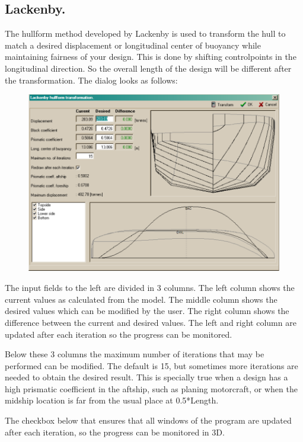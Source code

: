 \documentclass[12pt]{article}
\begin{document}
\subsection{Lackenby.}
The hullform method developed by Lackenby is used to transform the
hull to match a desired displacement or longitudinal center of
buoyancy while maintaining fairness of your design. This is done by
shifting controlpoints in the longitudinal direction. So the overall
length of the design will be different after the transformation. The
dialog looks as follows:

\begin{figure}[h]
        \centering
        \includegraphics[width=15cm,natwidth=881,natheight=620]{lackenbydialog.png}
        \caption{}
        \label{fig:lackenby}
\end{figure}

The input fields to the left are divided in 3 columns. The left column
shows the current values as calculated from the model. The middle
column shows the desired values which can be modified by the user. The
right column shows the difference between the current and desired
values. The left and right column are updated after each iteration so
the progress can be monitored.

Below these 3 columns the maximum number of iterations that may be
performed can be modified.  The default is 15, but sometimes more
iterations are needed to obtain the desired result. This is specially
true when a design has a high prismatic coefficient in the aftship,
such as planing motorcraft, or when the midship location is far from
the usual place at 0.5*Length.

The checkbox below that ensures that all windows of the program are
updated after each iteration, so the progress can be monitored in 3D.
\end{document}
